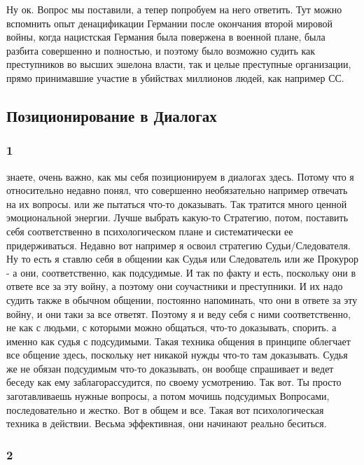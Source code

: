 Ну ок. Вопрос мы поставили, а тепер попробуем на него ответить. Тут можно
вспомнить опыт денацификации Германии после окончания второй мировой войны,
когда нацистская Германия была повержена в военной плане, была разбита
совершенно и полностью, и поэтому было возможно судить как преступников во
высших эшелона власти, так и целые преступные организации, прямо принимавшие
участие в убийствах миллионов людей, как например СС.



\subsection{Позиционирование в Диалогах}

\subsubsection{1}

знаете, очень важно, как мы себя позиционируем в диалогах здесь. Потому что я
относительно недавно понял, что совершенно необязательно например отвечать на
их вопросы. или же пытаться что-то доказывать. Так тратится много ценной
эмоциональной энергии. Лучше выбрать какую-то Стратегию, потом, поставить себя
соответственно в психологическом плане и систематически ее придерживаться.
Недавно вот например я освоил стратегию Судьи/Следователя. Ну то есть я ставлю
себя в общении как Судья или Следователь или же Прокурор - а они,
соответственно, как подсудимые. И так по факту и есть, поскольку они в ответе
все за эту войну, а поэтому они соучастники и преступники. И их надо судить
также в обычном общении, постоянно напоминать, что они в ответе за эту войну, и
они таки за все ответят. Поэтому я и веду себя с ними соответственно, не как с
людьми, с которыми можно общаться, что-то доказывать, спорить. а именно как
судья с подсудимыми. Такая техника общения в принципе облегчает все общение
здесь, поскольку нет никакой нужды что-то там доказывать. Судья же не обязан
подсудимым что-то доказывать, он вообще спрашивает и ведет беседу как ему
заблагорассудится, по своему усмотрению. Так вот. Ты просто заготавливаешь
нужные вопросы, а потом мочишь подсудимых Вопросами, последовательно и жестко.
Вот в общем и все. Такая вот психологическая техника в действии. Весьма
эффективная, они начинают реально беситься.

\subsubsection{2}

